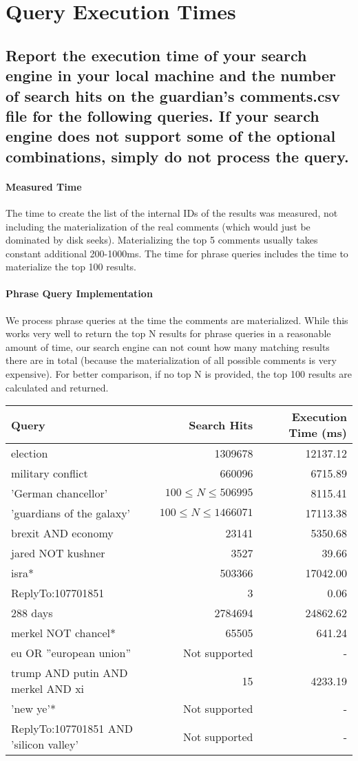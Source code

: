 \documentclass{scrartcl}
\begin{document}
\section {Query Execution Times}

\subsection{Report the execution time of your search engine in your local machine and the number of search hits on the guardian’s comments.csv file for the following queries. If your search engine does not support some of the optional combinations, simply do not process the query.}

\paragraph{Measured Time} The time to create the list of the internal IDs of the results was measured, not including the materialization of the real comments (which would just be dominated by disk seeks). Materializing the top 5 comments usually takes constant additional 200-1000ms. The time for phrase queries includes the time to materialize the top 100 results.

\paragraph{Phrase Query Implementation} We process phrase queries at the time the comments are materialized. While this works very well to return the top N results for phrase queries in a reasonable amount of time, our search engine can not count how many matching results there are in total (because the materialization of all possible comments is very expensive). For better comparison, if no top N is provided, the top 100 results are calculated and returned.

\bigskip
\begin{tabular}{l|r|r}
	Query & Search Hits & Execution Time (ms) \\
	\hline
	election & 1309678 & 12137.12 \\
	military conflict & 660096 & 6715.89 \\
	'German chancellor' & $100 \le N \le 506995$ & 8115.41 \\
	'guardians of the galaxy' & $100 \le N \le 1466071$ & 17113.38 \\
	brexit AND economy & 23141 & 5350.68 \\
	jared NOT kushner & 3527 & 39.66 \\
	isra* & 503366 & 17042.00 \\
	ReplyTo:107701851 & 3 & 0.06 \\
	288 days & 2784694 & 24862.62 \\
	merkel NOT chancel* & 65505 & 641.24 \\
	eu OR ”european union” & Not supported & - \\
	trump AND putin AND merkel AND xi & 15 & 4233.19 \\
	’new ye’* & Not supported & - \\
	ReplyTo:107701851 AND ’silicon valley’ & Not supported & - \\
\end{tabular}
\end{document}
